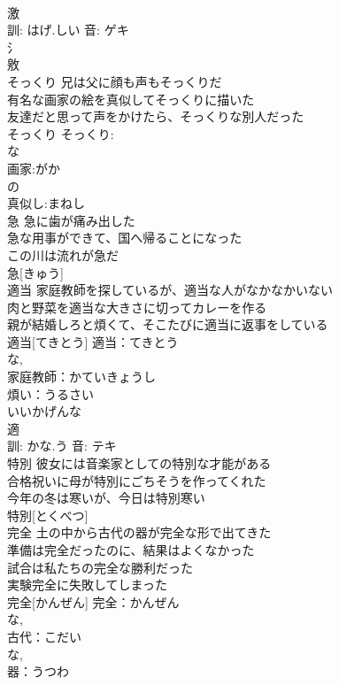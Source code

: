 \documentclass[8pt]{extreport}
\begin{document}
\begin{CJK}{UTF8}{min}
\\	激 
\\	訓: はげ.しい 音: ゲキ 
\\	氵 
\\	敫	
\\	そっくり	兄は父に顔も声もそっくりだ 
\\	有名な画家の絵を真似してそっくりに描いた 
\\	友達だと思って声をかけたら、そっくりな別人だった 
\\	そっくり			そっくり:
\\	な 
\\	画家:がか
\\	の 
\\	真似し:まねし
\\	急	急に歯が痛み出した 
\\	急な用事ができて、国へ帰ることになった 
\\	この川は流れが急だ 
\\	急[きゅう]						
\\	適当	家庭教師を探しているが、適当な人がなかなかいない 
\\	肉と野菜を適当な大きさに切ってカレーを作る 
\\	親が結婚しろと煩くて、そこたびに適当に返事をしている 
\\	適当[てきとう]			適当：てきとう
\\	な, 
\\	家庭教師：かていきょうし
\\	煩い：うるさい
\\	いいかげんな 
\\	適 
\\	訓: かな.う 音: テキ 
\\	特別	彼女には音楽家としての特別な才能がある 
\\	合格祝いに母が特別にごちそうを作ってくれた 
\\	今年の冬は寒いが、今日は特別寒い 
\\	特別[とくべつ]						
\\	完全	土の中から古代の器が完全な形で出てきた 
\\	準備は完全だったのに、結果はよくなかった 
\\	試合は私たちの完全な勝利だった 
\\	実験完全に失敗してしまった 
\\	完全[かんぜん]			完全：かんぜん
\\	な, 
\\	古代：こだい
\\	な, 
\\	器：うつわ

\end{CJK}
\end{document}
